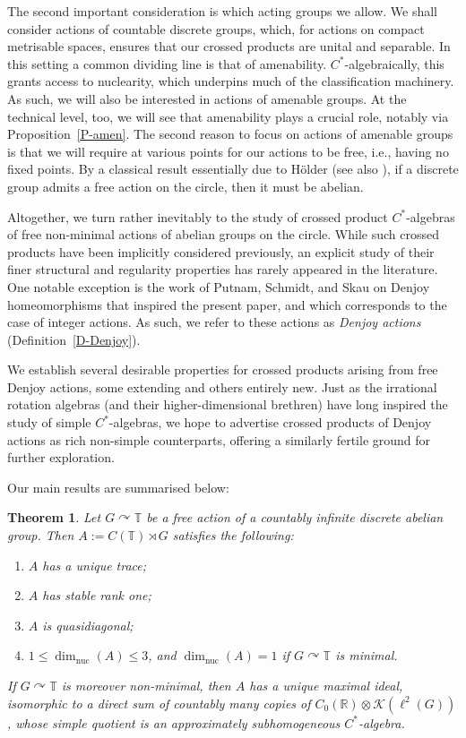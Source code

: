 \documentclass[11pt,a4paper,leqno]{amsart}
\theoremstyle{definition}
\theoremstyle{remark}
\numberwithin{equation}{section}
\theoremstyle{plain}
\newcounter{theoremintro}
\newtheorem{theoremi}[theoremintro]{Theorem}
\newcommand{\Tb}{\mathbb{T}}
\newcommand{\Rb}{\mathbb{R}}
\begin{document}
The second important consideration is which acting groups we allow. We shall consider actions of countable discrete groups, which, for actions on compact metrisable spaces, ensures that our crossed products are unital and separable. In this setting a common dividing line is that of amenability. $C^*$-algebraically, this grants access to nuclearity, which underpins much of the classification machinery. As such, we will also be interested in actions of amenable groups. At the technical level, too, we will see that amenability plays a crucial role, notably via Proposition~\ref{P-amen}. The second reason to focus on actions of amenable groups is that we will require at various points for our actions to be free, i.e., having no fixed points. By a classical result essentially due to H\"older \cite{Hol96} (see also \cite[Theorem 2.2.32]{Nav11}), if a discrete group admits a free action on the circle, then it must be abelian.  

Altogether, we turn rather inevitably to the study of crossed product $C^*$-algebras of free non-minimal actions of abelian groups on the circle. While such crossed products have been implicitly considered previously, an explicit study of their finer structural and regularity properties has rarely appeared in the literature. One notable exception is the work of Putnam, Schmidt, and Skau on Denjoy homeomorphisms \cite{PutSchSka86} that inspired the present paper, and which corresponds to the case of integer actions. As such, we refer to these actions as \emph{Denjoy actions} (Definition~\ref{D-Denjoy}). 

We establish several desirable properties for crossed products arising from free Denjoy actions, some extending \cite{PutSchSka86} and others entirely new. Just as the irrational rotation algebras (and their higher-dimensional brethren) have long inspired the study of simple $C^*$-algebras, we hope to advertise crossed products of Denjoy actions as rich non-simple counterparts, offering a similarly fertile ground for further exploration. 

Our main results are summarised below:

\begin{theoremi}\label{T-A}
	Let $G\curvearrowright \Tb$ be a free action of a countably infinite discrete abelian group. Then $A := C(\Tb) \rtimes G$ satisfies the following:
	\begin{enumerate} 
		\item $A$ has a unique trace;
		\item $A$ has stable rank one;
		\item $A$ is quasidiagonal; 
		\item $1\le \dim_{\operatorname{nuc}}(A) \le 3$, and $\dim_{\operatorname{nuc}}(A) = 1$ if $G\curvearrowright \Tb$ is minimal. 
	\end{enumerate} 
	If $G\curvearrowright \Tb$ is moreover non-minimal, then $A$ has a unique maximal ideal, isomorphic to a direct sum of countably many copies of $C_0(\Rb)\otimes \mathcal{K}(\ell^2(G))$, whose simple quotient is an approximately subhomogeneous $C^*$-algebra.
\end{theoremi}
\end{document}
